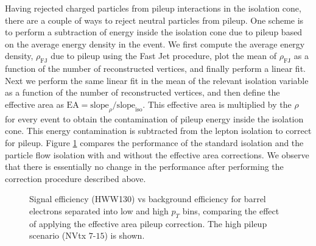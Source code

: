 Having rejected charged particles from pileup interactions in the isolation cone, there are
a couple of ways to reject neutral particles from pileup. One scheme is to perform a 
subtraction of energy inside the isolation cone due to pileup based on the average energy
density in the event. We first compute the average energy density, $\rho_{\mathrm{FJ}}$ due to 
pileup using the Fast Jet procedure, plot the mean of $\rho_{\mathrm{FJ}}$ as a function of
the number of reconstructed vertices, and finally perform a linear fit. Next we perform the 
same linear fit in the mean of the relevant isolation variable as a function of the number of 
reconstructed vertices, and then define the effective area as 
$\mathrm{EA} = \mathrm{slope}_{\rho} / \mathrm{slope}_{\mathrm{iso}}$. This effective area 
is multiplied by the $\rho$ for every event to obtain the contamination of pileup energy
inside the isolation cone. This energy contamination is subtracted from the lepton isolation
to correct for pileup. Figure \ref{fig:IsoPerformance_EleBarrel_EffectiveAreaCorrection}
compares the performance of the standard isolation and the particle flow isolation with and
without the effective area corrections. We observe that there is essentially no change
in the performance after performing the correction procedure described above.

\begin{figure}[!htbp]
\begin{center}
\caption{Signal efficiency (HWW130) vs background efficiency for barrel electrons separated into 
low and high $p_{T}$ bins, comparing the effect of applying the effective area pileup correction.
The high pileup scenario (NVtx $7$-$15$) is shown.}
\label{fig:IsoPerformance_EleBarrel_EffectiveAreaCorrection}
\end{center}
\end{figure}

